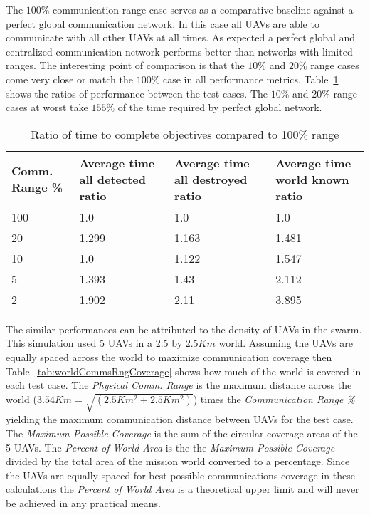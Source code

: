 \begin{multicols*}{2}

The $100\%$ communication range case serves as a comparative baseline against a perfect global communication network.  In this case all UAVs are able to communicate with all other UAVs at all times.  As expected a perfect global and centralized communication network performs better than networks with limited ranges.  The interesting point of comparison is that the $10\%$ and $20\%$ range cases come very close or match the $100\%$ case in all performance metrics.  Table~\ref{tab:avgResultsRatio} shows the ratios of performance between the test cases.  The $10\%$ and $20\%$ range cases at worst take $155\%$ of the time required by perfect global network.

\begin{table}[H]
	\caption{Ratio of time to complete objectives compared to 100\% range}
	\centering
	\label{tab:avgResultsRatio}
	\begin{tabular}{|p{1.25cm}|p{1.5cm}|p{1.75cm}|p{1.5cm}|}
		\hline
		Comm. Range \% & Average time all detected ratio & Average time all destroyed ratio & Average time world known ratio\\
		\hline
		100 & 1.0   & 1.0   & 1.0   \\ \hline
		20  & 1.299 & 1.163 & 1.481 \\ \hline
		10  & 1.0   & 1.122 & 1.547 \\ \hline
		5   & 1.393 & 1.43  & 2.112 \\ \hline
		2   & 1.902 & 2.11  & 3.895 \\ \hline
	\end{tabular}
\end{table} 

The similar performances can be attributed to the density of UAVs in the swarm.  This simulation used 5 UAVs in a 2.5 by 2.5$Km$ world.  Assuming the UAVs are equally spaced across the world to maximize communication coverage then Table~\ref{tab:worldCommsRngCoverage} shows how much of the world is covered in each test case.  The \textit{Physical Comm. Range} is the maximum distance across the world ($3.54Km = \sqrt{(2.5Km^{2}+2.5Km^{2})}$) times the \textit{Communication Range \%} yielding the maximum communication distance between UAVs for the test case.  The \textit{Maximum Possible Coverage} is the sum of the circular coverage areas of the 5 UAVs.  The \textit{Percent of World Area} is the the \textit{Maximum Possible Coverage} divided by the total area of the mission world converted to a percentage.  Since the UAVs are equally spaced for best possible communications coverage in these calculations the \textit{Percent of World Area} is a theoretical upper limit and will never be achieved in any practical means.


\end{multicols*}
